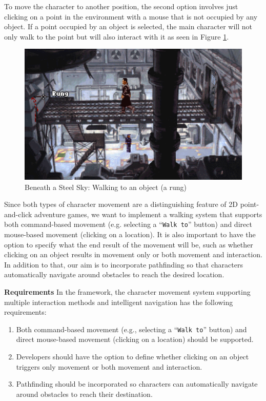 To move the character to another position, the second option involves just clicking on a point in the environment with a mouse that is not occupied by any object. If a point occupied by an object is selected, the main character will not only walk to the point but will also interact with it as seen in Figure \ref{fig:M-BaSS}.

\begin{figure}[H]
\centering
\includegraphics[width=.8\linewidth]{img/M-BaSS.png}
\caption{Beneath a Steel Sky: Walking to an object (a rung)}
\label{fig:M-BaSS}
\end{figure}

Since both types of character movement are a distinguishing feature of 2D point-and-click adventure games, we want to implement a walking system that supports both command-based movement (e.g. selecting a “\texttt{Walk to}” button) and direct mouse-based movement (clicking on a location). It is also important to have the option to specify what the end result of the movement will be, such as whether clicking on an object results in movement only or both movement and interaction. In addition to that, our aim is to incorporate pathfinding so that characters automatically navigate around obstacles to reach the desired location. 
\par
\vspace{5mm}
\textbf{Requirements} \quad In the framework, the character movement system supporting multiple interaction methods and intelligent navigation has the following requirements:

\begin{enumerate}[label=\color{teal}\textbf{R{\arabic*}},resume]
  \item \label{intro:req:com+mouse_move} Both command-based movement (e.g., selecting a “\texttt{Walk to}” button) and direct mouse-based movement (clicking on a location) should be supported.
  \item \label{intro:req:mox_move} Developers should have the option to define whether clicking on an object triggers only movement or both movement and interaction.
  \item \label{intro:req:pathfinding}Pathfinding should be incorporated so characters can automatically navigate around obstacles to reach their destination.
\end{enumerate}

